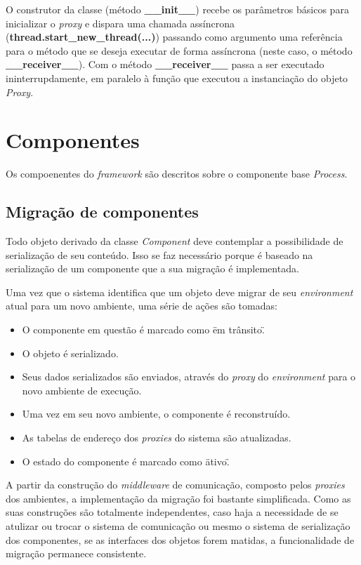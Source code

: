 O construtor da classe (método \textbf{\_\_init\_\_}) recebe os parâmetros básicos para inicializar o \textit{proxy} e dispara uma chamada assíncrona (\textbf{thread.start\_new\_thread(...)}) passando como argumento uma referência para o método que se deseja executar de forma assíncrona (neste caso, o método \textbf{\_\_receiver\_\_}). Com o método \textbf{\_\_receiver\_\_} passa a ser executado ininterrupdamente, em paralelo à função que executou a instanciação do objeto \textit{Proxy}.

\section{Componentes \label{implement_components}}

Os compoenentes do \textit{framework} são descritos sobre o componente base \textit{Process}. 

\subsection{Migração de componentes \label{migrar_componentes}}

Todo objeto derivado da classe \textit{Component} deve contemplar a possibilidade de serialização de seu conteúdo. Isso se faz necessário porque é baseado na serialização de um componente que a sua migração é implementada.

Uma vez que o sistema identifica que um objeto deve migrar de seu \textit{environment} atual para um novo ambiente, uma série de ações são tomadas:

\begin{itemize}
	\item O componente em questão é marcado como \"em trânsito\".
	\item O objeto é serializado.
	\item Seus dados serializados são enviados, através do \textit{proxy} do \textit{environment} para o novo ambiente de execução.
	\item Uma vez em seu novo ambiente, o componente é reconstruído.
	\item As tabelas de endereço dos \textit{proxies} do sistema são atualizadas.
	\item O estado do componente é marcado como \"ativo\".
\end{itemize}

A partir da construção do \textit{middleware} de comunicação, composto pelos \textit{proxies} dos ambientes, a implementação da migração foi bastante simplificada. Como as suas construções são totalmente independentes, caso haja a necessidade de se atulizar ou trocar o sistema de comunicação ou mesmo o sistema de serialização dos componentes, se as interfaces dos objetos forem matidas, a funcionalidade de migração permanece consistente.

